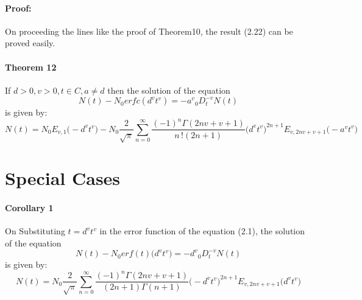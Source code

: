 \documentclass{article}
\begin{document}
\paragraph{Proof:}
On proceeding the lines like the proof of Theorem10, the result (2.22) can be proved easily.
\paragraph{Theorem 12}
If $d > 0, v > 0, t \in C, a \neq d $ then the solution of the equation
\begin{equation}
    N(t) - {N_0}erfc({d^v}{t^v}) = {-a^v}{_0D_t^{-v}}N(t)
\end{equation}
is given by:
\begin{equation}
    N(t)=
    N_0
    E_{v, 1}
    {\big(-{{d^v}}{t^v}\big)}
    -N_0{\frac{2}{\sqrt{\pi}}}
    \sum_{n = 0}^{\infty}
    \frac{(-1)^n\Gamma{(2nv+v+1)}}{n\,!(2n+1)}
    \big({d^v}{t^v}\big)^{2n+1}
    E_{v, 2nv+v+1}
    \big(-{a^v}{t^v})
\end{equation}
\section{Special Cases}
\paragraph{Corollary 1}
On Substituting $t = {d^v}{t^v}$ in the error function of the equation (2.1), the solution of the equation
\begin{equation}
    N(t) -{N_0}erf(t)\big({d^v}{t^v}\big)= {-d^v}{_0D_t^{-v}}N(t)
\end{equation}
is given by:
\begin{equation}
    N(t) = N_0
    {\frac{2}{\sqrt{\pi}}}
    \sum_{n = 0}^{\infty}
    \frac{{(-1)^n}\Gamma{(2nv+v+1)}}{(2n+1)\Gamma{(n+1)}}
    \big(-{d^v}{t^v}\big)^{2n+1}
    E_{v, 2nv+v+1}
    \big({d^v}{t^v}\big)
\end{equation}
\end{document}
